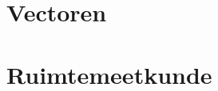 \documentclass[pdftex,fleqn,a4paper]{article}
\begin{document}
 \section{Vectoren}
 \label{sec:Vectoren}
   
   
 \section{Ruimtemeetkunde}
 \label{sec:Ruimtemeetkunde}
   
   
   

 
 \ttfamily  
\end{document}
